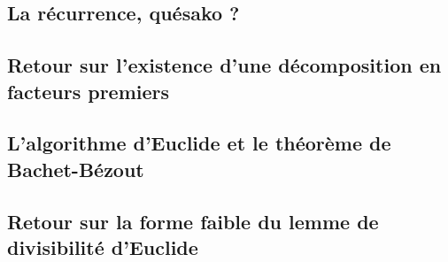 \subsection{La récurrence, quésako ?}




\subsection{Retour sur l'existence d'une décomposition en facteurs premiers}\label{exists-decompo-clean}




\subsection{L'algorithme d'Euclide et le théorème de Bachet-Bézout}




\subsection{Retour sur la forme faible du lemme de divisibilité d'Euclide}\label{euclide-weak-lemma}

